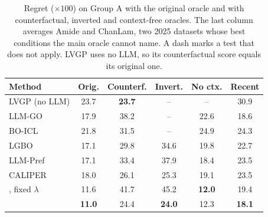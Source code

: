 \begin{table}[t]
\centering
\small
\setlength{\tabcolsep}{2.4pt}
\begin{tabular}{@{}l ccccc@{}}
\toprule
Method & Orig. & Counterf. & Invert. & No ctx. & Recent \\
\midrule
LVGP (no LLM) & 23.7 & \textbf{23.7} & -- & -- & 30.9 \\
LLM-GO & 17.9 & 38.2 & -- & 22.6 & 18.6 \\
BO-ICL & 21.8 & 31.5 & -- & 24.9 & 24.3 \\
LGBO & 17.1 & 29.8 & 34.6 & 19.8 & 22.7 \\
LLM-Pref & 17.1 & 33.4 & 37.9 & 18.4 & 23.5 \\
CALIPER & 18.0 & 26.1 & 25.3 & 19.1 & 23.5 \\
\midrule
\ours{}, fixed $\lambda$ & 11.6 & 41.7 & 45.2 & \textbf{12.0} & 19.4 \\
\rowcolor{tacitrow}
\ours{} & \textbf{11.0} & 24.4 & \textbf{24.0} & 12.3 & \textbf{18.1} \\
\bottomrule
\end{tabular}
\caption{Regret ($\times 100$) on Group A with the original oracle and with counterfactual, inverted and context-free oracles. The last column averages Amide and ChanLam, two 2025 datasets whose best conditions the main oracle cannot name. A dash marks a test that does not apply. LVGP uses no LLM, so its counterfactual score equals its original one.}
\label{tab:robust}
\end{table}
